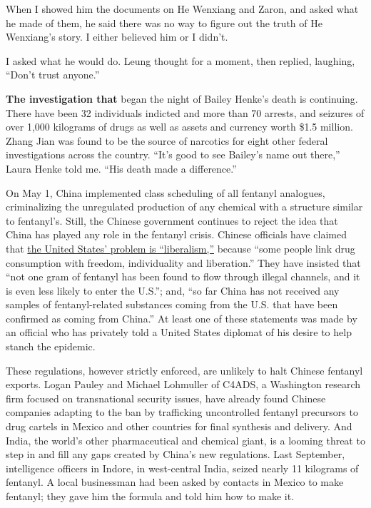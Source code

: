 When I showed him the documents on He Wenxiang and Zaron, and asked what
he made of them, he said there was no way to figure out the truth of He
Wenxiang's story. I either believed him or I didn't.

I asked what he would do. Leung thought for a moment, then replied,
laughing, ``Don't trust anyone.''

\textbf{The investigation that} began the night of Bailey Henke's death
is continuing. There have been 32 individuals indicted and more than 70
arrests, and seizures of over 1,000 kilograms of drugs as well as assets
and currency worth \$1.5 million. Zhang Jian was found to be the source
of narcotics for eight other federal investigations across the country.
``It's good to see Bailey's name out there,'' Laura Henke told me. ``His
death made a difference.''

On May 1, China implemented class scheduling of all fentanyl analogues,
criminalizing the unregulated production of any chemical with a
structure similar to fentanyl's. Still, the Chinese government continues
to reject the idea that China has played any role in the fentanyl
crisis. Chinese officials have claimed that
\href{http://www.globaltimes.cn/content/1138921.shtml}{the United
States' problem is ``liberalism,''} because ``some people link drug
consumption with freedom, individuality and liberation.'' They have
insisted that ``not one gram of fentanyl has been found to flow through
illegal channels, and it is even less likely to enter the U.S.''; and,
``so far China has not received any samples of fentanyl-related
substances coming from the U.S. that have been confirmed as coming from
China.'' At least one of these statements was made by an official who
has privately told a United States diplomat of his desire to help stanch
the epidemic.

These regulations, however strictly enforced, are unlikely to halt
Chinese fentanyl exports. Logan Pauley and Michael Lohmuller of C4ADS, a
Washington research firm focused on transnational security issues, have
already found Chinese companies adapting to the ban by trafficking
uncontrolled fentanyl precursors to drug cartels in Mexico and other
countries for final synthesis and delivery. And India, the world's other
pharmaceutical and chemical giant, is a looming threat to step in and
fill any gaps created by China's new regulations. Last September,
intelligence officers in Indore, in west-central India, seized nearly 11
kilograms of fentanyl. A local businessman had been asked by contacts in
Mexico to make fentanyl; they gave him the formula and told him how to
make it.

